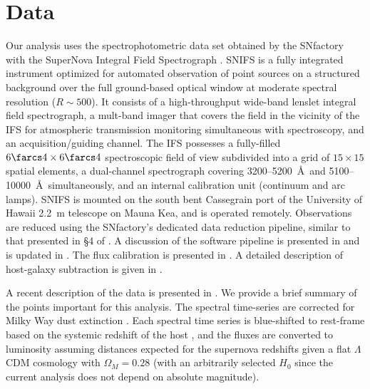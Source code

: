 \documentclass[trackchanges]{aastex61}   	%
\begin{document}
\section{Data}
\label{data:sec}

Our analysis uses the spectrophotometric data set obtained by
the SNfactory with the SuperNova Integral Field
Spectrograph \citep[SNIFS,][]{2002SPIE.4836...61A, 2004SPIE.5249..146L}.  SNIFS is a fully integrated
instrument optimized for automated observation of point sources on a
structured background over the full ground-based optical window at
moderate spectral resolution ($R \sim 500$).  It consists of a
high-throughput wide-band lenslet integral field spectrograph, a mult-band
imager that covers the field in the vicinity of
the IFS for atmospheric transmission monitoring simultaneous with
spectroscopy, and an acquisition/guiding channel.  The IFS possesses a
fully-filled $6\farcs 4 \times 6\farcs 4$ spectroscopic field of view
subdivided into a grid of $15 \times 15$ spatial elements, a
dual-channel spectrograph covering 3200--5200~\AA\ and 5100--10000~\AA\
simultaneously, and an internal calibration unit (continuum and arc
lamps).  SNIFS is mounted on the south bent Cassegrain port of the
University of Hawaii 2.2~m telescope on Mauna Kea, and is operated
remotely.  Observations are reduced using the SNfactory's dedicated data
reduction pipeline, similar to that presented in \S4 of \citet{2001MNRAS.326...23B}.
A discussion of the software pipeline is presented in
\citet{2006ApJ...650..510A} and is updated in \citet{2010ApJ...713.1073S}. 
The flux calibration is presented in \citet{2013A&A...549A...8B}.
A detailed
description of host-galaxy subtraction is given in \citet{2011MNRAS.418..258B}.

A recent description of the data is presented in \citet{2015ApJ...815...58F}.
We provide a brief summary of the points important for this analysis.
The spectral time-series  are corrected for Milky Way dust
extinction \citep{1989ApJ...345..245C,1998ApJ...500..525S}.  
Each spectral time series is
blue-shifted to rest-frame
based on the systemic redshift of the host \citep[c.f.][]{2013ApJ...770..107C}, and the fluxes are converted to luminosity assuming
distances expected for the supernova redshifts given a flat
$\Lambda$CDM cosmology with $\Omega_M = 0.28$ (with an arbitrarily selected
$H_0$ since the current analysis does not depend on absolute magnitude).
\end{document}
